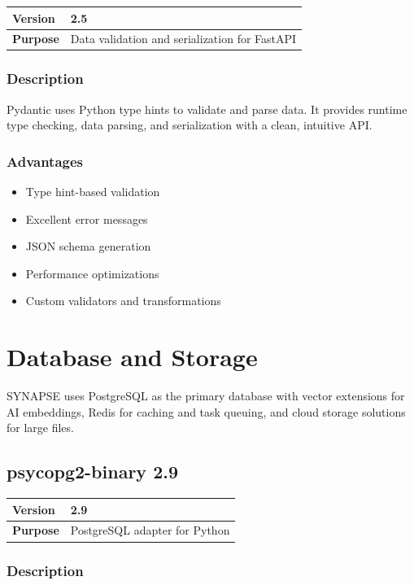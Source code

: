 \documentclass[12pt,a4paper]{report}
\begin{document}
\begin{tabular}{|p{4cm}|p{10cm}|}
\hline
\textbf{Version} & 2.5 \\
\hline
\textbf{Purpose} & Data validation and serialization for FastAPI \\
\hline
\end{tabular}

\subsection{Description}

Pydantic uses Python type hints to validate and parse data. It provides runtime type checking, data parsing, and serialization with a clean, intuitive API.

\subsection{Advantages}

\begin{itemize}
    \item Type hint-based validation
    \item Excellent error messages
    \item JSON schema generation
    \item Performance optimizations
    \item Custom validators and transformations
\end{itemize}

\chapter{Database and Storage}

SYNAPSE uses PostgreSQL as the primary database with vector extensions for AI embeddings, Redis for caching and task queuing, and cloud storage solutions for large files.

\section{psycopg2-binary 2.9}

\begin{tabular}{|p{4cm}|p{10cm}|}
\hline
\textbf{Version} & 2.9 \\
\hline
\textbf{Purpose} & PostgreSQL adapter for Python \\
\hline
\end{tabular}

\subsection{Description}
\end{document}
